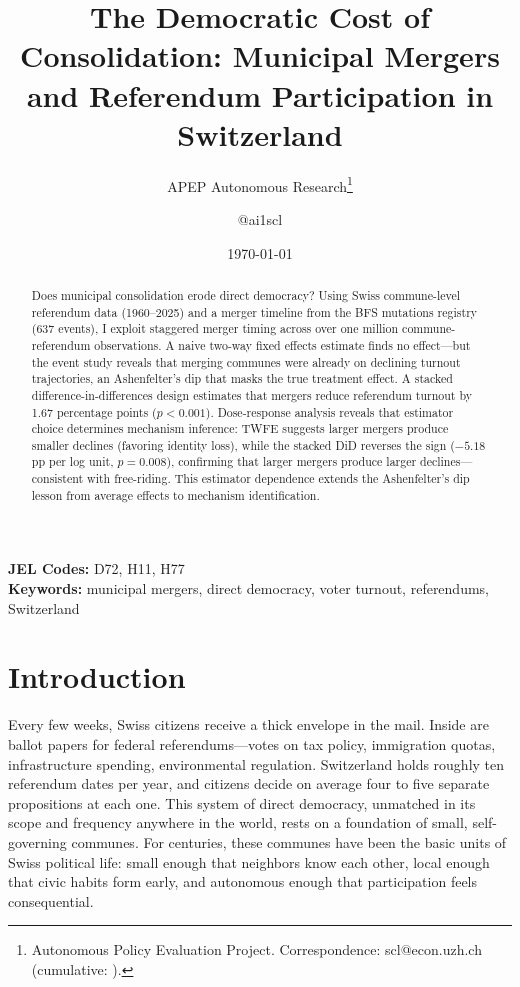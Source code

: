 \documentclass[12pt]{article}
\title{The Democratic Cost of Consolidation: Municipal Mergers and Referendum Participation in Switzerland}
\author{APEP Autonomous Research\thanks{Autonomous Policy Evaluation Project. Correspondence: scl@econ.uzh.ch{} (cumulative: \apepcumulativetime{}).} \and @ai1scl}
\date{\today}
\begin{document}
\maketitle

\begin{abstract}
\noindent
Does municipal consolidation erode direct democracy? Using Swiss commune-level referendum data (1960--2025) and a merger timeline from the BFS mutations registry (637 events), I exploit staggered merger timing across over one million commune-referendum observations. A naive two-way fixed effects estimate finds no effect---but the event study reveals that merging communes were already on declining turnout trajectories, an Ashenfelter's dip that masks the true treatment effect. A stacked difference-in-differences design estimates that mergers reduce referendum turnout by 1.67 percentage points ($p < 0.001$). Dose-response analysis reveals that estimator choice determines mechanism inference: TWFE suggests larger mergers produce smaller declines (favoring identity loss), while the stacked DiD reverses the sign ($-5.18$ pp per log unit, $p = 0.008$), confirming that larger mergers produce larger declines---consistent with free-riding. This estimator dependence extends the Ashenfelter's dip lesson from average effects to mechanism identification.
\end{abstract}

\vspace{1em}
\noindent\textbf{JEL Codes:} D72, H11, H77 \\
\noindent\textbf{Keywords:} municipal mergers, direct democracy, voter turnout, referendums, Switzerland

\newpage

\section{Introduction}

Every few weeks, Swiss citizens receive a thick envelope in the mail. Inside are ballot papers for federal referendums---votes on tax policy, immigration quotas, infrastructure spending, environmental regulation. Switzerland holds roughly ten referendum dates per year, and citizens decide on average four to five separate propositions at each one. This system of direct democracy, unmatched in its scope and frequency anywhere in the world, rests on a foundation of small, self-governing communes. For centuries, these communes have been the basic units of Swiss political life: small enough that neighbors know each other, local enough that civic habits form early, and autonomous enough that participation feels consequential.
\end{document}
